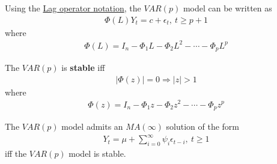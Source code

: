 \documentclass[11pt]{elegantbook}
\begin{document}
Using the \underline{Lag operator notation}, the $VAR(p)$ model can be written as
\begin{equation}
    \begin{aligned}
        \Phi(L)Y_t=c+\epsilon_t,\ t\geq p+1
    \end{aligned}
    \nonumber
\end{equation}
where
\begin{equation}
    \begin{aligned}
        \Phi(L)=I_n-\Phi_1 L-\Phi_2 L^2-\cdots-\Phi_p L^p
    \end{aligned}
    \nonumber
\end{equation}

\begin{definition}
    The $VAR(p)$ is \textbf{stable} iff
    \begin{equation}
        \begin{aligned}
            |\Phi(z)|=0 \Rightarrow |z|>1
        \end{aligned}
        \nonumber
    \end{equation}
    where
    \begin{equation}
        \begin{aligned}
            \Phi(z)=I_n-\Phi_1 z-\Phi_2 z^2-\cdots-\Phi_p z^p
        \end{aligned}
        \nonumber
    \end{equation}
\end{definition}

\begin{lemma}
    The $VAR(p)$ model admits an $MA(\infty)$ solution of the form
    \begin{equation}
        \begin{aligned}
            Y_t=\mu+\sum_{i=0}^\infty \psi_i\epsilon_{t-i},\ t\geq 1
        \end{aligned}
        \nonumber
    \end{equation}
    iff the $VAR(p)$ model is stable.
\end{lemma}
\end{document}
